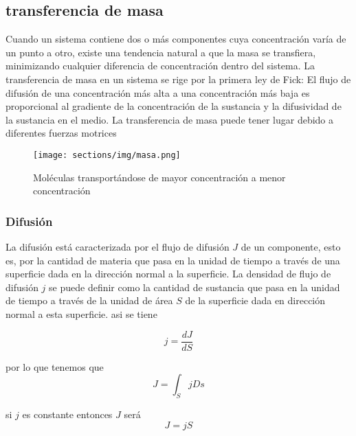 \subsection{transferencia de masa}
Cuando un sistema contiene dos o más componentes cuya concentración
varía de un punto a otro, existe una tendencia natural a que la masa
se transfiera, minimizando cualquier diferencia de concentración
dentro del sistema. La transferencia de masa en un sistema se rige
por la primera ley de Fick: El flujo de difusión de una concentración
más alta a una concentración más baja es proporcional al gradiente
de la concentración de la sustancia y la difusividad de la sustancia
en el medio. La transferencia de masa puede tener lugar debido a
diferentes fuerzas motrices

\begin{figure}[ht]
    \begin{center}
        \texttt{[image: sections/img/masa.png]}
    \end{center}
    \caption{Moléculas transportándose de mayor concentración
    a menor concentración}
\end{figure}

\subsubsection{Difusión}
La difusión está caracterizada por el flujo
de difusión $J$ de un componente, esto es, por la
cantidad de materia que pasa en la unidad
de tiempo a través de una superficie dada en la dirección
normal a la superficie.
La densidad de flujo de difusión $j$
se puede definir como la cantidad de sustancia que
pasa en la unidad de tiempo a través de la unidad de área $S$
de la superficie dada en dirección normal a esta superficie.
asi se tiene

\begin{equation}
    \label{eq:densidad:flujo}
    j = \frac{dJ}{dS}
\end{equation}

por lo que tenemos que
\begin{equation}
    J = \int_S jDs
\end{equation}

si $j$ es constante entonces $J$ será
\begin{equation}
    J = jS
\end{equation}

